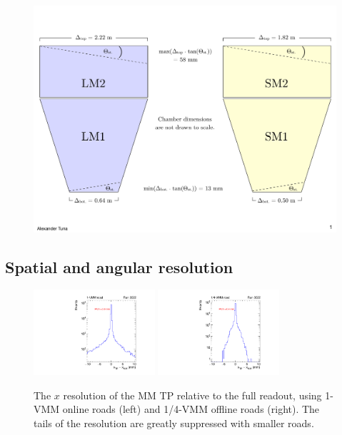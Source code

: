 \begin{figure}[!htpb]
  \begin{center}
    \includegraphics[width=1.0\textwidth]{figures/cartoons/stereo_roads.pdf}
  \end{center}
  \vspace{-10pt}
  \caption{}
  \label{fig:stereo_roads}
\end{figure}

\subsection{Spatial and angular resolution}
\label{sec:perf-res}

\begin{figure}[!htpb]
  \begin{center}
    \includegraphics[width=0.4\textwidth]{figures/gbtanalysis3522/TP_xres_full.pdf}
    \includegraphics[width=0.4\textwidth]{figures/gbtanalysis3522/TP_xres.pdf}
  \end{center}
  \vspace{-10pt}
  \caption{The $x$ resolution of the MM TP relative to the full readout, using 1-VMM online roads (left) and 1/4-VMM offline roads (right). The tails of the resolution are greatly suppressed with smaller roads.}
  \label{fig:xres}
\end{figure}

